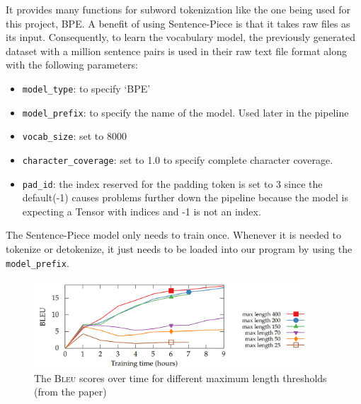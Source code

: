\documentclass[12pt,a4paper,twoside,openright]{report}
\newcommand{\bleu}{\textsc{Bleu} }
\begin{document}
It provides many functions for subword tokenization like the one being used for this project, BPE. A benefit of using Sentence-Piece is that it takes raw files as its input. Consequently, to learn the vocabulary model, the previously generated dataset with a million sentence pairs is used in their raw text file format along with the following parameters:
\begin{itemize}
    \item \lstinline{model_type}: to specify `BPE'
    \item \lstinline{model_prefix}: to specify the name of the model. Used later in the pipeline
    \item \lstinline{vocab_size}: set to 8000
    \item \lstinline{character_coverage}: set to 1.0 to specify complete character coverage.
    \item \lstinline{pad_id}: the index reserved for the padding token is set to 3 since the default(-1) causes problems further down the pipeline because the model is expecting a Tensor with indices and -1 is not an index.

\end{itemize}
The Sentence-Piece model only needs to train once. Whenever it is needed to tokenize or detokenize, it just needs to be loaded into our program by using the \lstinline{model_prefix}.

\begin{figure}[H]
    \centering
    \includegraphics[width=0.9\textwidth]{figs/fig4frompaper-trainingtips.PNG}
    \caption{The \bleu scores over time for different maximum length thresholds \\(from the paper\cite{training-tips})
    }
    \label{fig:figure-4-from-paper}
\end{figure}
\end{document}
